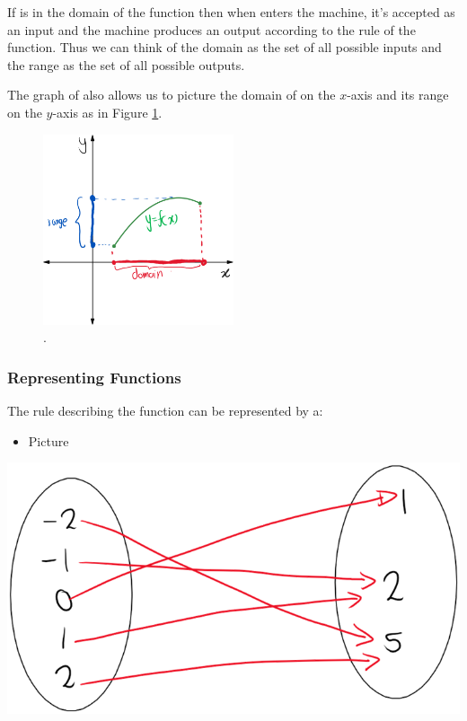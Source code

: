 \documentclass[
]{book}
\providecommand{\tightlist}{%
  \setlength{\itemsep}{0pt}\setlength{\parskip}{0pt}}
\theoremstyle{definition}
\theoremstyle{definition}
\theoremstyle{definition}
\theoremstyle{definition}
\theoremstyle{remark}
\begin{document}
If is in the domain of the function then when enters the machine, it's accepted as an input and the machine produces an output according to the rule of the function. Thus we can think of the domain as the set of all possible inputs and the range as the set of all possible outputs.

The graph of also allows us to picture the domain of on the \(x\)-axis and its range on the \(y\)-axis as in Figure \ref{fig:fig4}.

\begin{figure}
\centering
\includegraphics[width=0.5\textwidth,height=\textheight]{fig/fig4.png}
\caption{. \label{fig:fig4}}
\end{figure}

\subsubsection{Representing Functions}\label{representing-functions}

The rule describing the function can be represented by a:

\begin{itemize}
\tightlist
\item
  Picture
\end{itemize}

\includegraphics{fig/fig1.png}
\end{document}
